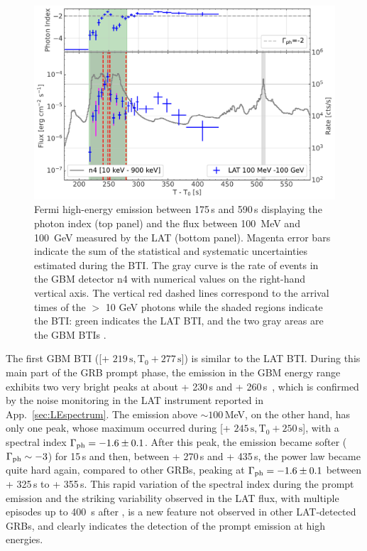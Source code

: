 \documentclass[preprint]{aastex631}
\begin{document}
%
\begin{figure}[t]
    \centering    
    \includegraphics[width=\textwidth]{flux_light_curve_logy.pdf}
    \caption{Fermi high-energy emission between 175\,s and 590\,s displaying the photon index (top panel) and the flux between 100~MeV and 100~GeV measured by the \Fermi LAT (bottom panel). 
    Magenta error bars indicate the sum of the statistical and systematic uncertainties estimated during the BTI. The gray curve is the rate of events in the GBM detector n4  with numerical values on the right-hand vertical axis. The vertical red dashed lines correspond to the arrival times of the $>$ 10 GeV photons while the shaded regions indicate the BTI: green indicates the LAT BTI, and the two gray areas are the GBM BTIs \citep{2023ApJ...952L..42L}.}
    \label{fig:flux_prompt}
\end{figure}

The first GBM BTI ([\trig + $  219\,\mathrm{s},\mathrm{T}_0+ 277\,\mathrm{s}]$) is similar to the LAT BTI. During this main part of the GRB prompt phase, the emission in the GBM energy range exhibits two very bright peaks at about \trig+ 230\,s and \trig+ 260\,s~\citep{2023ApJ...952L..42L}, which is confirmed by the noise monitoring in the LAT instrument reported in App.~\ref{sec:LEspectrum}. 
The emission above $\sim100$\,MeV, on the other hand, has only one peak, whose maximum occurred during [\trig + $  245\,\mathrm{s},\mathrm{T}_0+ 250\,\mathrm{s}$], with a spectral index $\Gamma_{\rm ph} = -1.6 \pm 0.1$. 
After this peak, the emission became softer ($\Gamma_{\rm ph} \sim -3$) for 15\,s and then, between \trig+ 270\,s and \trig+ 435\,s, the power law became quite hard again, compared to other \lat GRBs, peaking at $\Gamma_{\rm ph} =-1.6 \pm 0.1$ between \trig+ 325\,s to \trig+ 355\,s. This rapid variation of the spectral index during the prompt emission and the striking variability observed in the LAT flux, with multiple episodes up to 400~s after \trig, is a new feature not observed in other LAT-detected GRBs, and clearly indicates the detection of the prompt emission at high energies.
\end{document}
